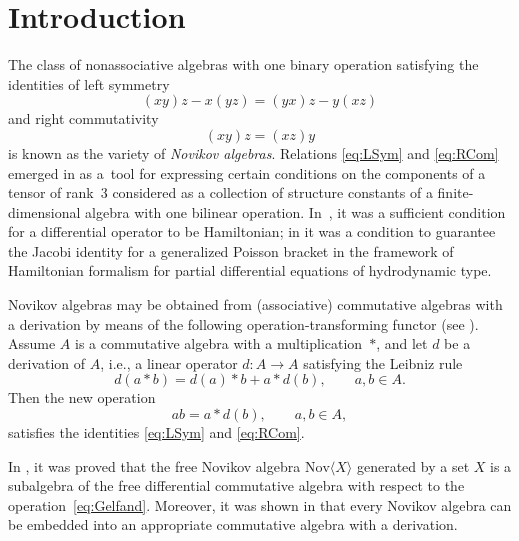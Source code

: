 \documentclass[pdftex]{sigma}
\numberwithin{equation}{section}
\def\Nov{\mathrm{Nov}}
\begin{document}



\section{Introduction}%

The class of nonassociative algebras with one binary operation satisfying the identities of left symmetry
%
\begin{equation}\label{eq:LSym}
(xy)z - x(yz) = (yx)z - y(xz)
\end{equation}
%
and right commutativity
%
\begin{equation}\label{eq:RCom}
(xy)z = (xz)y
\end{equation}
%
is known as the variety of {\em Novikov algebras}.
Relations \eqref{eq:LSym} and \eqref{eq:RCom} emerged
in \cite{BN1985, GD79} as a~tool
for expressing certain conditions on the components of
a tensor of rank~3 considered
as a collection of structure constants of a finite-dimensional
 algebra with one bilinear operation.
 In~\cite{GD79}, it was a sufficient condition
for a differential operator to be Hamiltonian;
in \cite{BN1985} it was a condition to guarantee
the Jacobi identity for a generalized Poisson bracket in
the framework of Hamiltonian formalism for partial differential
equations of hydrodynamic type.

Novikov algebras may be obtained from (associative) commutative algebras
with a derivation by means of the following operation-transforming functor (see \cite{GD79}).
Assume $A$ is a commutative algebra
with a multiplication~$*$, and let $d$ be a derivation of $A$, i.e.,
 a linear operator $d\colon A\to A$
satisfying the Leibniz rule
\[
d(a*b) = d(a)*b+a*d(b), \qquad a,b\in A.
\]
Then the new operation
\begin{equation}\label{eq:Gelfand}
ab = a*d(b), \qquad a,b\in A,
\end{equation}
satisfies the identities \eqref{eq:LSym} and \eqref{eq:RCom}.

In \cite{DzhLofwall2002}, it was proved that the free Novikov
algebra $\Nov \langle X\rangle $ generated by a set $X$ is
a subalgebra of the free differential commutative algebra
with respect to the operation~\eqref{eq:Gelfand}.
Moreover, it was shown in \cite{BCZ-2017} that every Novikov algebra
can be embedded into an appropriate
commutative algebra with a derivation.
\end{document}
